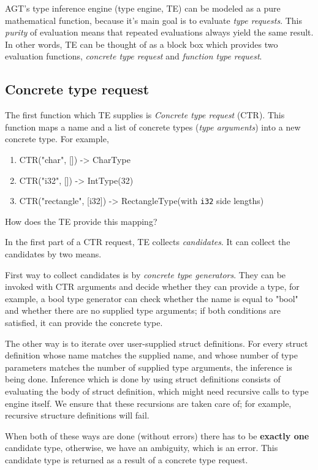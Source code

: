 \documentclass[times, utf8, diplomski]{fer}
\theoremstyle{definition}
\begin{document}
AGT's type inference engine (type engine, TE) can be modeled as a 
pure mathematical function, because it's main goal is to evaluate \textit{type requests}.
This \textit{purity} of evaluation means that repeated evaluations always yield the same result.
In other words, TE can be thought of as a block box which provides two evaluation functions,
\textit{concrete type request} and \textit{function type request}.

\subsection{Concrete type request}

The first function which TE supplies is \textit{Concrete type request} (CTR). This function maps
a name and a list of concrete types (\textit{type arguments}) into a new concrete type. For example,

\begin{enumerate}
    \item CTR("char", []) -> CharType
    \item CTR("i32", []) -> IntType(32)
    \item CTR("rectangle", [i32]) -> RectangleType(with \texttt{i32} side lengths)
\end{enumerate}

How does the TE provide this mapping? 

In the first part of a CTR request, TE collects \textit{candidates}.
It can collect the candidates by two means.

First way to collect candidates is by \textit{concrete type generators}.
They can be invoked with CTR arguments and decide whether they can provide a type, for example,
a bool type generator can check whether the name is equal to "bool" and whether 
there are no supplied type arguments; if both conditions are satisfied,
it can provide the concrete type.

The other way is to iterate over user-supplied struct definitions.
For every struct definition whose name matches the supplied name, 
and whose number of type parameters matches the number of supplied type arguments,
the inference is being done. Inference which is done by 
using struct definitions consists of evaluating the body of struct definition,
which might need recursive calls to type engine itself. We ensure that these
recursions are taken care of; for example, recursive structure definitions will fail.

When both of these ways are done (without errors) there has to be \textbf{exactly one} candidate type,
otherwise, we have an ambiguity, which is an error. This candidate type is returned as a result
of a concrete type request.
\end{document}
